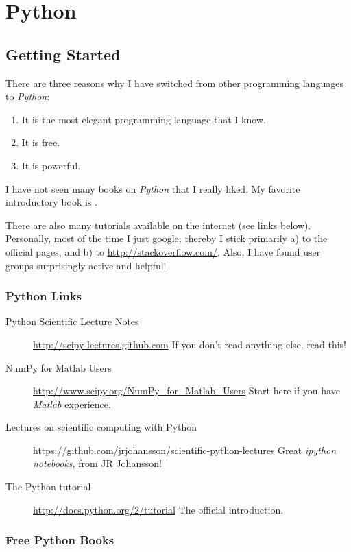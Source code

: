 \chapter{Python}

\section{Getting Started}

There are three reasons why I have switched from other programming languages to \emph{Python}:

\begin{enumerate}
  \item It is the most elegant programming language that I know.
  \item It is free.
  \item It is powerful.
\end{enumerate}

I have not seen many books on \emph{Python} that I really liked. My favorite introductory book is \cite{Harms2010}.

There are also many tutorials available on the internet (see links below). Personally, most of the time I just google; thereby I stick primarily a) to the official pages, and b) to \url{http://stackoverflow.com/}. Also, I have found user groups surprisingly active and helpful!

\subsection{Python Links}

\begin{description}
  \item[Python Scientific Lecture Notes] \url{http://scipy-lectures.github.com} If you don't read anything else, read this!
  \item[NumPy for Matlab Users] \url{http://www.scipy.org/NumPy\_for\_Matlab\_Users} Start here if you have \emph{Matlab} experience.
  \item[Lectures on scientific computing with Python] \url{https://github.com/jrjohansson/scientific-python-lectures} Great \emph{ipython notebooks}, from JR Johansson!
  \item[The Python tutorial] \url{http://docs.python.org/2/tutorial} The official introduction.
\end{description}

\subsection{Free Python Books}

